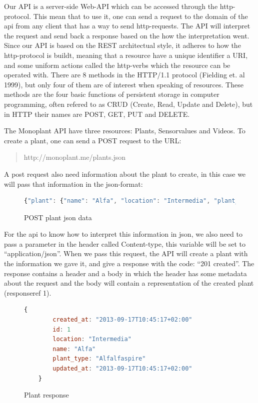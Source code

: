Our API is a server-side Web-API which can be accessed through the http-protocol. This mean that to use it, one can send a request to the domain of the api from any client that has a way to send http-requests. The API will interpret the request and send back a response based on the how the interpretation went. Since our API is based on the REST architectual style, it adheres to how the http-protocol is buildt, meaning that a resource have a unique identifier a URI, and some uniform actions called the http-verbs which the resource can be operated with. There are 8 methods in the HTTP/1.1 protocol (Fielding et. al 1999), but only four of them are of interest when speaking of resources. These methods are the four basic functions of persistent storage in computer programming, often refered to as CRUD (Create, Read, Update and Delete), but in HTTP their names are POST, GET, PUT and DELETE.

The Monoplant API have three resources: Plants, Sensorvalues and Videos. To create a plant, one can send a POST request to the URL:

\begin{quote}
http://monoplant.me/plants.json 
\end{quote}

A post request also need information about the plant to create, in this case we will pass that information in the json-format:

\begin{figure}
	\begin{lstlisting}[language=javascript]
	 {"plant": {"name": "Alfa", "location": "Intermedia", "plant_type": "Alfalfaspire"}} 
	\end{lstlisting}
	\caption{POST plant json data}
	\label{fig:postdata}
\end{figure}

For the api to know how to interpret this information in json, we also need to pass a parameter in the header called Content-type, this variable will be set to “application/json”. When we pass this request, the API will create a plant with the information we gave it, and give a response with the code: “201 created”. The response contains a header and a body in which the header has some metadata about the request and the body will contain a representation of the created plant (responseref 1).

\begin{figure}
	\begin{lstlisting}[language=javascript]
	{
		created_at: "2013-09-17T10:45:17+02:00"
		id: 1
		location: "Intermedia"
		name: "Alfa"
		plant_type: "Alfalfaspire"
		updated_at: "2013-09-17T10:45:17+02:00"
	}
	\end{lstlisting}
	\caption{Plant response}
	\label{fig:plantresponse}
\end{figure}


